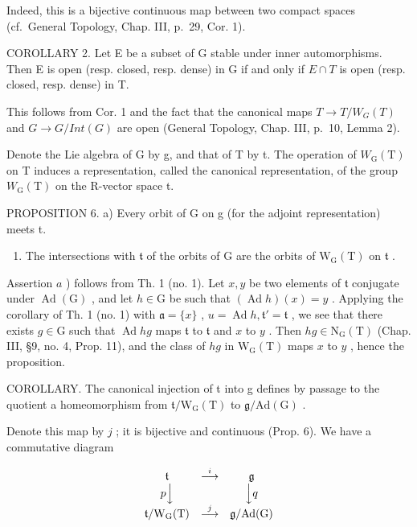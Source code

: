 Indeed, this is a bijective continuous map between two compact spaces (cf.~General Topology, Chap. III, p.~29, Cor. 1).

COROLLARY 2. Let E be a subset of G stable under inner automorphisms. Then E is open (resp. closed, resp. dense) in G if and only if \(E \cap T\) is open (resp. closed, resp. dense) in T.

This follows from Cor. 1 and the fact that the canonical maps \(T \rightarrow T/W_{G}(T)\) and \(G \rightarrow G/Int(G)\) are open (General Topology, Chap. III, p.~10, Lemma 2).

Denote the Lie algebra of G by g, and that of T by t. The operation of \(W_{\mathrm{G}}(\mathrm{T})\) on T induces a representation, called the canonical representation, of the group \(W_{\mathrm{G}}(\mathrm{T})\) on the R-vector space t.

PROPOSITION 6. a) Every orbit of G on g (for the adjoint representation) meets t.

\begin{enumerate}
\def\labelenumi{\alph{enumi})}
\setcounter{enumi}{1}
\tightlist
\item
  The intersections with \(\mathfrak{t}\) of the orbits of \(\mathrm{G}\) are the orbits of \(\mathrm{W_G(T)}\) on \(\mathfrak{t}\) .
\end{enumerate}

Assertion \(a\) ) follows from Th. 1 (no. 1). Let \(x, y\) be two elements of \(\mathfrak{t}\) conjugate under \(\operatorname{Ad}(\mathrm{G})\) , and let \(h \in \mathrm{G}\) be such that \((\operatorname{Ad} h)(x) = y\) . Applying the corollary of Th. 1 (no. 1) with \(\mathfrak{a} = \{x\}\) , \(u = \operatorname{Ad} h, \mathfrak{t}' = \mathfrak{t}\) , we see that there exists \(g \in \mathrm{G}\) such that \(\operatorname{Ad} hg\) maps \(\mathfrak{t}\) to \(\mathfrak{t}\) and \(x\) to \(y\) . Then \(hg \in \mathrm{N}_{\mathrm{G}}(\mathrm{T})\) (Chap. III, §9, no. 4, Prop. 11), and the class of \(hg\) in \(\mathrm{W}_{\mathrm{G}}(\mathrm{T})\) maps \(x\) to \(y\) , hence the proposition.

COROLLARY. The canonical injection of t into g defines by passage to the quotient a homeomorphism from \(\mathfrak{t}/\mathrm{W}_{\mathrm{G}}(\mathrm{T})\) to \(\mathfrak{g}/\mathrm{Ad}(\mathrm{G})\) .

Denote this map by \(j\) ; it is bijective and continuous (Prop. 6). We have a commutative diagram

\[
\begin{array}{c c c} \mathfrak {t} & \stackrel {{i}} {{\longrightarrow}} & \mathfrak {g} \\ p \Big \downarrow & & \Big \downarrow q \\ \mathfrak {t} / \mathrm{W} _ {\mathrm{G}} (\mathrm{T}) & \stackrel {{j}} {{\longrightarrow}} & \mathfrak {g} / \mathrm{Ad} (\mathrm{G}) \end{array}
\]

